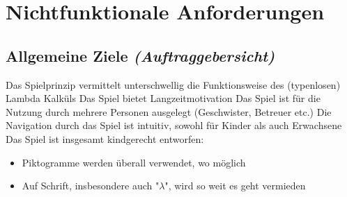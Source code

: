 \section{Nichtfunktionale Anforderungen}

\subsection{Allgemeine Ziele \textit{(Auftraggebersicht)}}
\begin{requirements}
	 Das Spielprinzip vermittelt unterschwellig die Funktionsweise des (typenlosen) Lambda Kalküls
	 Das Spiel bietet Langzeitmotivation
	 Das Spiel ist für die Nutzung durch mehrere Personen ausgelegt (Geschwister, Betreuer etc.)
	 Die Navigation durch das Spiel ist intuitiv, sowohl für Kinder als auch Erwachsene
	 Das Spiel ist insgesamt kindgerecht entworfen:
		\begin{itemize}
			\item Piktogramme werden überall verwendet, wo möglich
			\item Auf Schrift, insbesondere auch "$\lambda$", wird so weit es geht vermieden
		\end{itemize}
\end{requirements}

